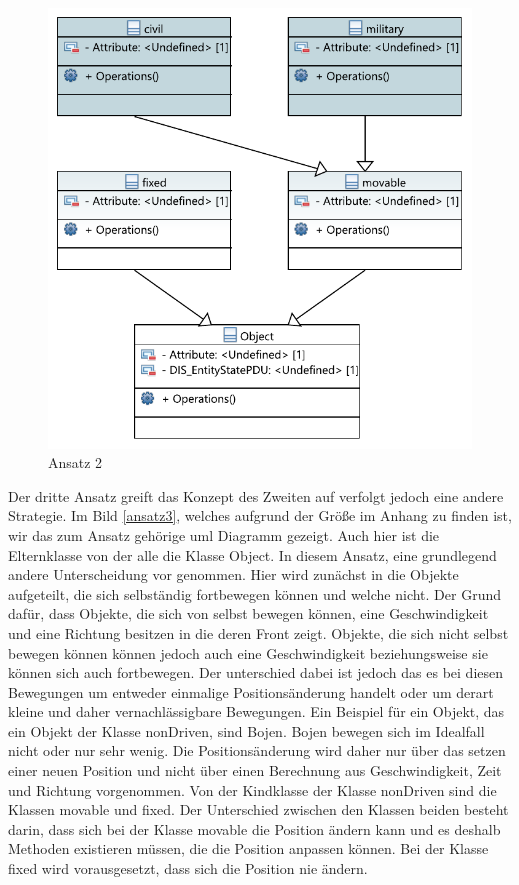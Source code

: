 \begin{figure}[H]
	\centering
	\includegraphics[scale=0.9]{bilder/pdfvorlagen/ansatz1}
	\caption[Ansatz 2]{Ansatz 2}
	\label{ansatz2}
\end{figure}
Der dritte Ansatz greift das Konzept des Zweiten auf verfolgt jedoch eine andere Strategie. Im Bild \ref{ansatz3}, welches aufgrund der Größe im Anhang zu finden ist, wir das zum Ansatz gehörige \ac{uml} Diagramm gezeigt. Auch hier ist die Elternklasse von der alle die Klasse \glqq Object\grqq{}. In diesem Ansatz, eine grundlegend andere Unterscheidung vor genommen. Hier wird zunächst in die Objekte aufgeteilt, die sich selbständig fortbewegen können und welche nicht. Der Grund dafür, dass Objekte, die sich von selbst bewegen können, eine Geschwindigkeit und eine Richtung besitzen in die deren Front zeigt. Objekte, die sich nicht selbst bewegen können können jedoch auch eine Geschwindigkeit beziehungsweise sie können sich auch fortbewegen. Der unterschied dabei ist jedoch das es bei diesen Bewegungen um entweder einmalige Positionsänderung handelt oder um derart kleine und daher vernachlässigbare Bewegungen. Ein Beispiel für ein Objekt, das ein Objekt der Klasse \glqq nonDriven\grqq{}, sind Bojen. Bojen bewegen sich im Idealfall nicht oder nur sehr wenig. Die Positionsänderung wird daher nur über das setzen einer neuen Position und nicht über einen Berechnung aus Geschwindigkeit, Zeit und Richtung vorgenommen. Von der Kindklasse der Klasse  \glqq nonDriven\grqq{} sind die Klassen \glqq movable\grqq{} und   \glqq fixed\grqq{}. Der Unterschied zwischen den Klassen beiden besteht darin, dass sich bei der Klasse  \glqq movable\grqq{} die Position ändern kann und es deshalb Methoden existieren müssen, die die Position anpassen können. Bei der Klasse \glqq fixed\grqq{} wird vorausgesetzt, dass sich die Position nie ändern.\\

